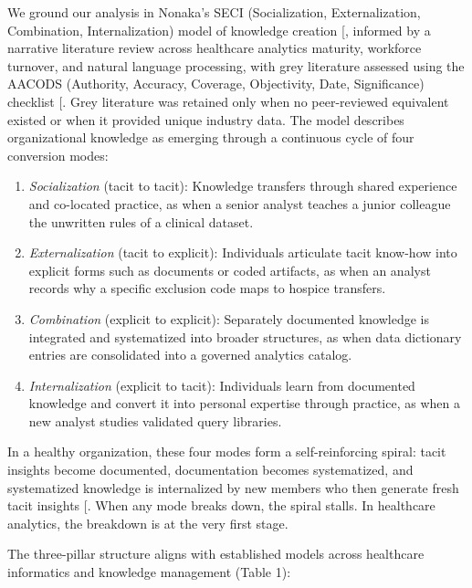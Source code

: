 \documentclass[
  american,
  11pt,
  letterpaper,
  oneside  ,captions=tableheading
]{scrartcl}
\providecommand{\tightlist}{%
  \setlength{\itemsep}{0pt}\setlength{\parskip}{0pt}}
\begin{document}
We ground our analysis in Nonaka's SECI (Socialization, Externalization,
Combination, Internalization) model of knowledge creation
{[}\citeproc{ref-farnese2019}{20}{]}, informed by a narrative literature
review across healthcare analytics maturity, workforce turnover, and
natural language processing, with grey literature assessed using the
AACODS (Authority, Accuracy, Coverage, Objectivity, Date, Significance)
checklist {[}\citeproc{ref-tyndall2010}{21}{]}. Grey literature was
retained only when no peer-reviewed equivalent existed or when it
provided unique industry data. The model describes organizational
knowledge as emerging through a continuous cycle of four conversion
modes:

\begin{enumerate}
\def\labelenumi{\arabic{enumi}.}
\tightlist
\item
  \emph{Socialization} (tacit to tacit): Knowledge transfers through
  shared experience and co-located practice, as when a senior analyst
  teaches a junior colleague the unwritten rules of a clinical dataset.
\item
  \emph{Externalization} (tacit to explicit): Individuals articulate
  tacit know-how into explicit forms such as documents or coded
  artifacts, as when an analyst records why a specific exclusion code
  maps to hospice transfers.
\item
  \emph{Combination} (explicit to explicit): Separately documented
  knowledge is integrated and systematized into broader structures, as
  when data dictionary entries are consolidated into a governed
  analytics catalog.
\item
  \emph{Internalization} (explicit to tacit): Individuals learn from
  documented knowledge and convert it into personal expertise through
  practice, as when a new analyst studies validated query libraries.
\end{enumerate}

In a healthy organization, these four modes form a self-reinforcing
spiral: tacit insights become documented, documentation becomes
systematized, and systematized knowledge is internalized by new members
who then generate fresh tacit insights
{[}\citeproc{ref-farnese2019}{20}{]}. When any mode breaks down, the
spiral stalls. In healthcare analytics, the breakdown is at the very
first stage.

The three-pillar structure aligns with established models across
healthcare informatics and knowledge management (Table 1):
\end{document}
